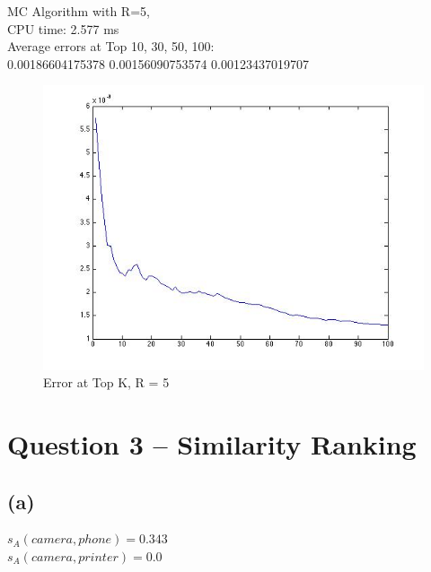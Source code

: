 \documentclass{article}
\begin{document}
MC Algorithm with R=5, \\
\indent CPU time: 2.577 ms\\
\indent Average errors at Top 10, 30, 50, 100:\\
0.00186604175378
0.00156090753574
0.00123437019707\\

\begin{figure}[H]
\centering
\includegraphics[scale=0.5]{q2-ErrorTopK-R5.jpg}
\caption{ Error at Top K, R = 5}
\label{}
\end{figure}

\section{Question 3 -- Similarity Ranking}
\subsection{(a)}
$s_A(camera, phone) = 0.343$\\
$s_A(camera, printer) = 0.0$\\
\end{document}
